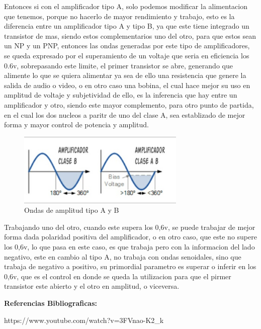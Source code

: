 \documentclass[12pt,a4paper]{article}
\begin{document}
Entonces si con el amplificador tipo A, solo podemos modificar la alimentacion que tenemos, porque no hacerlo de mayor rendimiento y trabajo, esto es la diferencia entre un amplificador tipo A y tipo B, ya que este tiene integrado un transistor de mas, siendo estos complementarios uno del otro, para que estos sean un NP y un PNP, entonces las  ondas generadas por este tipo de amplificadores, se queda expresado por el superamiento de un voltaje que seria en eficiencia los 0.6v, sobrepasando este limite, el primer transistor se abre, generando que alimente lo que se quiera alimentar ya sea de ello una resistencia que genere la salida de audio o video, o en otro caso una bobina, el cual hace mejor su uso en amplitud de voltaje y subjetividad de ello, es la inferencia que hay entre un amplificador y otro, siendo este mayor complemento, para otro punto de partida, en el cual los dos nucleos a paritr de uno del clase A, sea establizado de mejor forma y mayor control de potencia y amplitud.\\

\begin{figure}[hbtp]
\centering
\includegraphics[width=8cm]{5.jpg}
\caption{Ondas de amplitud tipo A y B}
\end{figure}


Trabajando uno del otro, cuando este supera los 0,6v, se puede trabajar de mejor forma dada polaridad positiva del amplificador, o en otro caso, que este no supere los 0,6v, lo que pasa en este caso, es que trabaja pero con la informacion del lado negativo, este en cambio al tipo A, no trabaja con ondas senoidales, sino que trabaja de negativo a positivo, su primordial parametro es superar o inferir en los 0,6v, que es el control en donde se queda la utilizacion para que el pirmer transistor este abierto y el otro en amplitud, o viceversa.

\textbf{Referencias Bibliograficas:}

https://www.youtube.com/watch?v=3FVnao-K2_k
\end{document}
